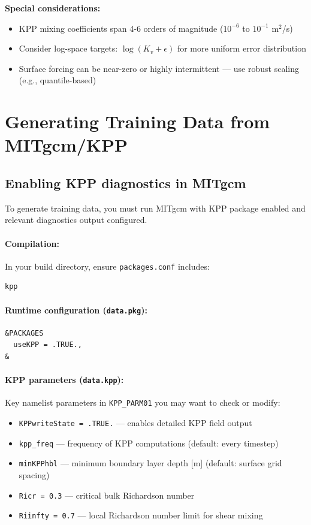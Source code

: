 \documentclass[11pt, a4paper]{article}
\begin{document}
\textbf{Special considerations:}
\begin{itemize}
    \item KPP mixing coefficients span 4-6 orders of magnitude ($10^{-6}$ to $10^{-1}$ m$^2$/s)
    \item Consider log-space targets: $\log(K_v + \epsilon)$ for more uniform error distribution
    \item Surface forcing can be near-zero or highly intermittent — use robust scaling (e.g., quantile-based)
\end{itemize}

\section{Generating Training Data from MITgcm/KPP}

\subsection{Enabling KPP diagnostics in MITgcm}

To generate training data, you must run MITgcm with KPP package enabled and relevant diagnostics output configured.

\paragraph{Compilation:} In your build directory, ensure \texttt{packages.conf} includes:
\begin{verbatim}
kpp
\end{verbatim}

\paragraph{Runtime configuration (\texttt{data.pkg}):}
\begin{verbatim}
&PACKAGES
  useKPP = .TRUE.,
&
\end{verbatim}

\paragraph{KPP parameters (\texttt{data.kpp}):}
Key namelist parameters in \texttt{KPP\_PARM01} you may want to check or modify:
\begin{itemize}
    \item \texttt{KPPwriteState = .TRUE.} — enables detailed KPP field output
    \item \texttt{kpp\_freq} — frequency of KPP computations (default: every timestep)
    \item \texttt{minKPPhbl} — minimum boundary layer depth [m] (default: surface grid spacing)
    \item \texttt{Ricr = 0.3} — critical bulk Richardson number
    \item \texttt{Riinfty = 0.7} — local Richardson number limit for shear mixing
\end{itemize}
\end{document}
